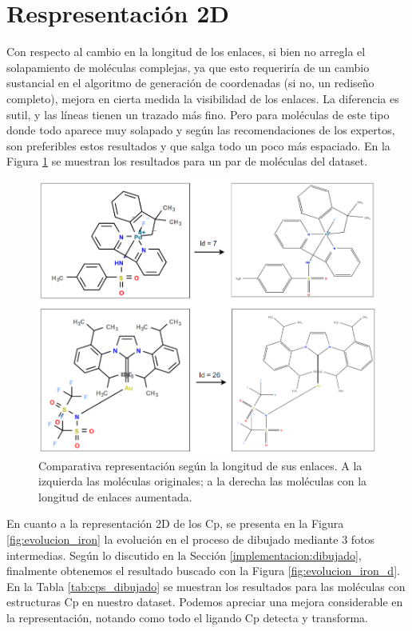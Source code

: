 \newpage

\section{Respresentación 2D}
Con respecto al cambio en la longitud de los enlaces, si bien no arregla el solapamiento de moléculas complejas, ya que esto requeriría de un cambio sustancial en el algoritmo de generación de coordenadas (si no, un rediseño completo), mejora en cierta medida la visibilidad de los enlaces. La diferencia es sutil, y las líneas tienen un trazado más fino. Pero para moléculas de este tipo donde todo aparece muy solapado y según las recomendaciones de los expertos, son preferibles estos resultados y que salga todo un poco más espaciado. En la Figura \ref{fig:bonds_longitud} se muestran los resultados para un par de moléculas del dataset.

\begin{figure}[h]
    \centering
    \includegraphics[scale=0.51]{imagenes/resultados/bond_longitud.png}
    \caption{Comparativa representación según la longitud de sus enlaces. A la izquierda las moléculas originales; a la derecha las moléculas con la longitud de enlaces aumentada.}
    \label{fig:bonds_longitud}
\end{figure}


En cuanto a la representación 2D de los Cp, se presenta en la Figura \ref{fig:evolucion_iron} la evolución en el proceso de dibujado mediante 3 fotos intermedias. Según lo discutido en la Sección \ref{implementacion:dibujado}, finalmente obtenemos el resultado buscado con la Figura \ref{fig:evolucion_iron_d}. En la Tabla \ref{tab:cps_dibujado} se muestran los resultados para las moléculas con estructuras Cp en nuestro dataset. Podemos apreciar una mejora considerable en la representación, notando como todo el ligando Cp detecta y transforma.

